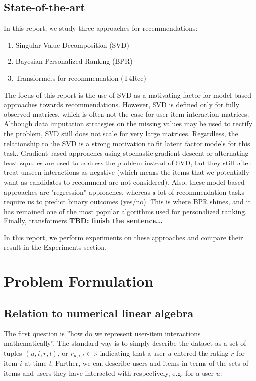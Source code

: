 \documentclass{article}
\begin{document}
\subsection{State-of-the-art}
In this report, we study three approaches for recommendations: 

\begin{enumerate}
    \item Singular Value Decomposition (SVD)
    \item Bayesian Personalized Ranking (BPR)
    \item Transformers for recommendation (T4Rec)
\end{enumerate}

The focus of this report is the use of SVD as a motivating factor for model-based approaches towards recommendations. However, SVD is defined only for fully observed matrices, which is often not the case for user-item interaction matrices. Although data imputation strategies on the missing values may be used to rectify the problem, SVD still does not scale for very large matrices. Regardless, the relationship to the SVD is a strong motivation to fit latent factor models for this task. Gradient-based approaches using stochastic gradient descent or alternating least squares are used to address the problem instead of SVD, but they still often treat unseen interactions as negative (which means the items that we potentially want as candidates to recommend are not considered). Also, these model-based approaches are "regression" approaches, whereas a lot of recommendation tasks require us to predict binary outcomes (yes/no). This is where BPR shines, and it has remained one of the most popular algorithms used for personalized ranking. Finally, transformers \textbf{TBD: finish the sentence...}

In this report, we perform experiments on these approaches and compare their result in the Experiments section. 


\section{Problem Formulation}

\subsection{Relation to numerical linear algebra}
The first question is ”how do we represent user-item interactions mathematically”. The standard way is to simply describe the dataset as a set of tuples $(u, i, r, t)$, or $r_{u,i,t} \in \mathbb{R}$ indicating that a user $u$ entered the rating $r$ for item $i$ at time $t$. Further, we can describe users and items in terms of the sets of items and users they have interacted with respectively, e.g. for a user $u$:
\end{document}
